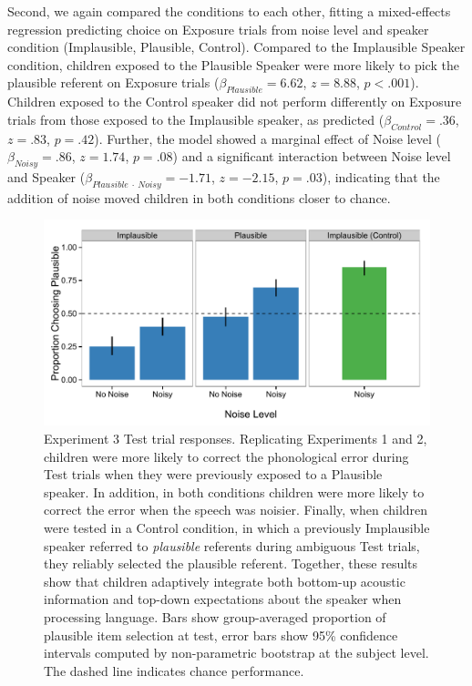 \documentclass[man,floatsintext]{apa6}
\begin{document}
Second, we again compared the conditions to each other, fitting a mixed-effects regression predicting choice on Exposure trials from noise level and speaker condition (Implausible, Plausible, Control). Compared to the Implausible Speaker condition, children exposed to the Plausible Speaker were more likely to pick the plausible referent on Exposure trials ($\beta_{Plausible} = 6.62$,  $z = 8.88$, $p <.001$). Children exposed to the Control speaker did not perform differently on Exposure trials from those exposed to the Implausible speaker, as predicted ($\beta_{Control} = .36$,  $z = .83$, $p = .42$). Further, the model showed a marginal effect of Noise level ($\beta_{Noisy} = .86$,  $z = 1.74$, $p = .08$) and a significant interaction between Noise level and Speaker ($\beta_{Plausible \: \cdot \: Noisy} = -1.71$, $z= -2.15$, $p = .03$), indicating that the addition of noise moved children in both conditions closer to chance.

\begin{figure}[t]
     \centering
     \includegraphics[width=5in]{figures/exp3_results.pdf}
    \caption{Experiment 3 Test trial responses. Replicating Experiments 1 and 2, children were more likely to correct the phonological error during Test trials when they were previously exposed to a Plausible speaker. In addition, in both conditions children were more likely to correct the error when the speech was noisier. Finally, when children were tested in a Control condition, in which a previously Implausible speaker referred to \emph{plausible} referents during ambiguous Test trials, they reliably selected the plausible referent. Together, these results show that children adaptively integrate both bottom-up acoustic information and top-down expectations about the speaker when processing language. Bars show group-averaged proportion of plausible item selection at test, error bars show 95\% confidence intervals computed by non-parametric bootstrap at the subject level. The dashed line indicates chance performance.}%
   \label{fig:exp3_results}
\end{figure}
\end{document}
